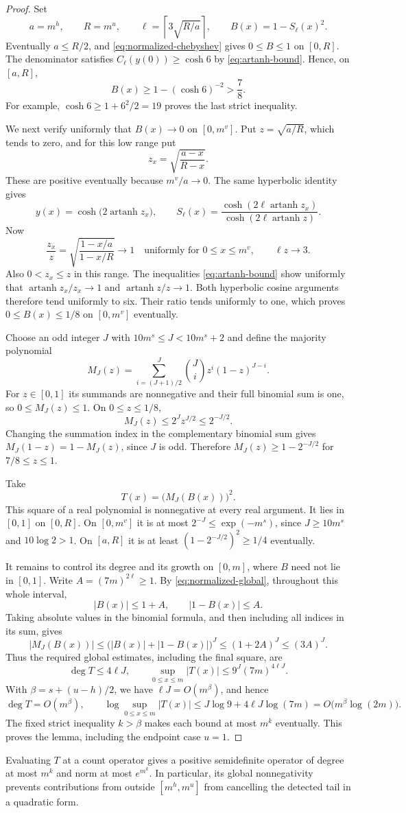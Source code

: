 \begin{proof}
Set
\[
 a=m^h,\qquad R=m^u,\qquad
 \ell=\left\lceil3\sqrt{R/a}\right\rceil,
 \qquad B(x)=1-S_\ell(x)^2.
\]
Eventually $a\le R/2$, and \eqref{eq:normalized-chebyshev} gives
$0\le B\le1$ on $[0,R]$.  The denominator satisfies
$C_\ell(y(0))\ge\cosh6$ by \eqref{eq:artanh-bound}.  Hence, on $[a,R]$,
\[
 B(x)\ge1-(\cosh6)^{-2}>\frac78.
\]
For example, $\cosh6\ge1+6^2/2=19$ proves the last strict inequality.

We next verify uniformly that $B(x)\to0$ on $[0,m^v]$.
Put $z=\sqrt{a/R}$, which tends to zero, and for this low range put
\[
 z_x=\sqrt{\frac{a-x}{R-x}}.
\]
These are positive eventually because $m^v/a\to0$.
The same hyperbolic identity gives
\[
 y(x)=\cosh\bigl(2\operatorname{artanh}z_x\bigr),
 \qquad
 S_\ell(x)=
 \frac{\cosh(2\ell\operatorname{artanh}z_x)}
      {\cosh(2\ell\operatorname{artanh}z)}.
\]
Now
\[
 \frac{z_x}{z}
 =\sqrt{\frac{1-x/a}{1-x/R}}\longrightarrow1
 \quad\text{uniformly for }0\le x\le m^v,
 \qquad \ell z\longrightarrow3.
\]
Also $0<z_x\le z$ in this range.  The inequalities
\eqref{eq:artanh-bound} show uniformly that
$\operatorname{artanh}z_x/z_x\to1$ and
$\operatorname{artanh}z/z\to1$.  Both hyperbolic cosine arguments
therefore tend uniformly to six.  Their ratio tends uniformly to one,
which proves $0\le B(x)\le1/8$ on $[0,m^v]$ eventually.

Choose an odd integer $J$ with $10m^s\le J<10m^s+2$ and define the
majority polynomial
\[
 M_J(z)=\sum_{i=(J+1)/2}^{J}\binom Ji z^i(1-z)^{J-i}.
\]
For $z\in[0,1]$ its summands are nonnegative and their full binomial
sum is one, so $0\le M_J(z)\le1$.  On $0\le z\le1/8$,
\[
 M_J(z)\le2^J z^{J/2}\le2^{-J/2}.
\]
Changing the summation index in the complementary binomial sum gives
$M_J(1-z)=1-M_J(z)$, since $J$ is odd.  Therefore
$M_J(z)\ge1-2^{-J/2}$ for $7/8\le z\le1$.

Take
\[
 T(x)=\bigl(M_J(B(x))\bigr)^2.
\]
This square of a real polynomial is nonnegative at every real argument.
It lies in $[0,1]$ on $[0,R]$.  On $[0,m^v]$ it is at most
$2^{-J}\le\exp(-m^s)$, since $J\ge10m^s$ and $10\log2>1$.
On $[a,R]$ it is at least $(1-2^{-J/2})^2\ge1/4$ eventually.

It remains to control its degree and its growth on $[0,m]$, where
$B$ need not lie in $[0,1]$.  Write $A=(7m)^{2\ell}\ge1$.
By \eqref{eq:normalized-global}, throughout this whole interval,
\[
 |B(x)|\le1+A,\qquad |1-B(x)|\le A.
\]
Taking absolute values in the binomial formula, and then including all
indices in its sum, gives
\[
 |M_J(B(x))|
 \le\bigl(|B(x)|+|1-B(x)|\bigr)^J
 \le(1+2A)^J\le(3A)^J.
\]
Thus the required global estimates, including the final square, are
\[
 \deg T\le4\ell J,\qquad
 \sup_{0\le x\le m}|T(x)|\le9^J(7m)^{4\ell J}.
\]
With $\beta=s+(u-h)/2$, we have $\ell J=O(m^\beta)$, and hence
\[
 \deg T=O(m^\beta),\qquad
 \log\sup_{0\le x\le m}|T(x)|
 \le J\log9+4\ell J\log(7m)
 =O\bigl(m^\beta\log(2m)\bigr).
\]
The fixed strict inequality $k>\beta$ makes each bound at most $m^k$
eventually.  This proves the lemma, including the endpoint case $u=1$.
\end{proof}

Evaluating $T$ at a count operator gives a positive semidefinite operator
of degree at most $m^k$ and norm at most $e^{m^k}$.  In particular, its
global nonnegativity prevents contributions from outside $[m^h,m^u]$
from cancelling the detected tail in a quadratic form.
